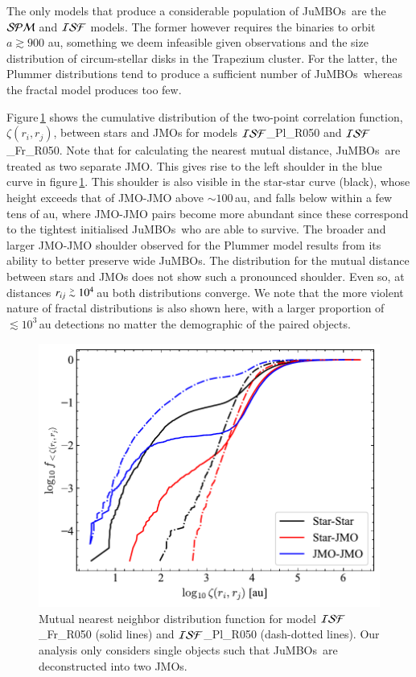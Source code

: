 \documentclass[submission,phys]{lib/SciPost}
\def\apgt{\ {\raise-.5ex\hbox{$\buildrel>\over\sim$}}\ }
\newcommand{\jumbos}{\mbox{JuMBOs}}
\begin{document}
The only models that produce a considerable population of \jumbos\,
are the ${\cal SPM}$ and ${\cal ISF}$ models. The former however
requires the binaries to orbit $a \gtrsim 900$ au, something we deem infeasible 
given observations and the size distribution of circum-stellar disks in the 
Trapezium cluster. For the latter, the Plummer distributions tend to produce 
a sufficient number of \jumbos\, whereas the fractal model produces too few.

Figure\,\ref{Fig:twopoint_correlation_ISF_Fr050} shows the cumulative
distribution of the two-point correlation function, $\zeta(r_i,r_j)$,
between stars and JMOs for models ${\cal ISF}$\_Pl\_R050 and ${\cal
  ISF}$\_Fr\_R050.  Note that for calculating the nearest mutual
distance, \jumbos\, are treated as two separate JMO.  This gives rise
to the left shoulder in the blue curve in
figure\,\ref{Fig:twopoint_correlation_ISF_Fr050}. This shoulder is
also visible in the star-star curve (black), whose height exceeds that
of JMO-JMO above $\sim 100$\,au, and falls below within a few tens of
au, where JMO-JMO pairs become more abundant since these correspond to
the tightest initialised \jumbos\, who are able to survive.  The
broader and larger JMO-JMO shoulder observed for the Plummer model
results from its ability to better preserve wide JuMBOs. The
distribution for the mutual distance between stars and JMOs does not
show such a pronounced shoulder.  Even so, at distances $r_{ij} \apgt
10^4$\,au both distributions converge.  We note that the more violent
nature of fractal distributions is also shown here, with a larger
proportion of $\lesssim10^{3}$\,au detections no matter the
demographic of the paired objects.

\begin{figure}
    \centering
        \includegraphics[width=0.75\columnwidth]{figures/two_point_corr_rvir0.5_jmo.pdf}
        \caption{Mutual nearest neighbor distribution function for
          model ${\cal ISF}$\_Fr\_R050 (solid lines) and ${\cal
            ISF}$\_Pl\_R050 (dash-dotted lines). Our analysis only
          considers single objects such that \jumbos\, are
          deconstructed into two JMOs.}
        \label{Fig:twopoint_correlation_ISF_Fr050}
\end{figure}
\end{document}
